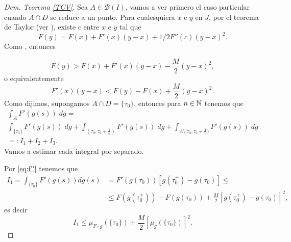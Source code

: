 \begin{proof}[Dem. Teorema \eqref{TCV}]
 
Sea $A\in \mathcal{B}(I)$, vamos a ver primero el caso particular \normalmarginpar{} cuando
$A\cap D$ se reduce a un punto.
 Para cualesquiera $x$ e $y$ en $J$, por el teorema de Taylor (ver \cite[pg 13]{Evans}), existe $c$ entre $x$ e $y$ tal que
		$$F(y)=F(x)+F'(x)(y-x)+1/2F''(c)(y-x)^2.$$
		Como  , \reversemarginpar{} entonces
 
		$$F(y)>F(x)+F'(x)(y-x)-\frac{M}{2}(y-x)^2,$$ 
		o equivalentemente 
		\begin{equation}	\label{eq:f''}
			F'(x)(y-x)<F(y)-F(x)+\frac{M}{2}(y-x)^2.
		\end{equation}
		Como dijimos, supongamos  $A\cap D=\{\tau_0\}$, entonces para $n\in \mathbb{N}$ tenemos que
		\begin{multline*}
			\int_AF'(g(s))\; dg=\\ \int_{\{\tau_0\}}F'(g(s))\; dg+\int_{(\tau_0,\tau_0+\frac{1}{n})}F'(g(s))\; dg+ \int_{A\setminus [\tau_0,\tau_0+\frac{1}{n})}F'(g(s))\; dg\\
             =:I_1+I_2+I_3.
		\end{multline*}
		Vamos a estimar cada integral por separado.
  
 Por \eqref{eq:f''} tenemos que
		\begin{equation*}
  \begin{split}
		I_1=\int_{\{\tau_0\}}F'(g(s))dg(s)&=F'(g(\tau_0))\left[g(\tau_0^+)-g(\tau_0) \right]\leq\\
		&\leq F(g(\tau_0^+))- F(g(\tau_0))+\frac{M}{2}\left[ g(\tau_0^+)-g(\tau_0)\right]^2,
  \end{split}
	\end{equation*}
	es decir
		\begin{equation}
			\label{eq:obs1}
			I_1\leq \mu_{F\circ g}(\{\tau_0\})+\frac{M}{2}\left[ \mu_{g}(\{\tau_0\})\right]^2 .
		\end{equation} 
	

\end{proof}
